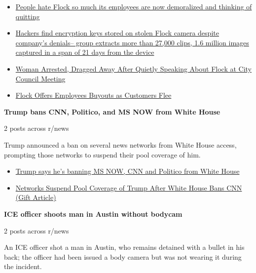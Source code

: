 \documentclass[11pt,a4paper]{article}
\begin{document}
\begin{itemize}
  \item \href{https://www.reddit.com/r/technology/comments/1wm2b9s/people_hate_flock_so_much_its_employees_are_now/}{People hate Flock so much its employees are now demoralized and thinking of quitting}
  \item \href{https://www.reddit.com/r/technology/comments/1wiv3uy/hackers_find_encryption_keys_stored_on_stolen/}{Hackers find encryption keys stored on stolen Flock camera despite company's denials-- group extracts more than 27,000 clips, 1.6 million images captured in a span of 21 days from the device}
  \item \href{https://www.reddit.com/r/technology/comments/1wo98cp/woman_arrested_dragged_away_after_quietly/}{Woman Arrested, Dragged Away After Quietly Speaking About Flock at City Council Meeting}
  \item \href{https://www.reddit.com/r/technology/comments/1wklgz3/flock_offers_employees_buyouts_as_customers_flee/}{Flock Offers Employees Buyouts as Customers Flee}
\end{itemize}
\vspace{6pt}
\textbf{Trump bans CNN, Politico, and MS NOW from White House}\par
{\small 2 posts across r/news}\par
\vspace{2pt}Trump announced a ban on several news networks from White House access, prompting those networks to suspend their pool coverage of him.\par
\begin{itemize}
  \item \href{https://www.reddit.com/r/news/comments/1wjzllf/trump_says_hes_banning_ms_now_cnn_and_politico/}{Trump says he's banning MS NOW, CNN and Politico from White House}
  \item \href{https://www.reddit.com/r/news/comments/1wmdg5n/networks_suspend_pool_coverage_of_trump_after/}{Networks Suspend Pool Coverage of Trump After White House Bans CNN (Gift Article)}
\end{itemize}
\vspace{6pt}
\textbf{ICE officer shoots man in Austin without bodycam}\par
{\small 2 posts across r/news}\par
\vspace{2pt}An ICE officer shot a man in Austin, who remains detained with a bullet in his back; the officer had been issued a body camera but was not wearing it during the incident.\par
\end{document}
